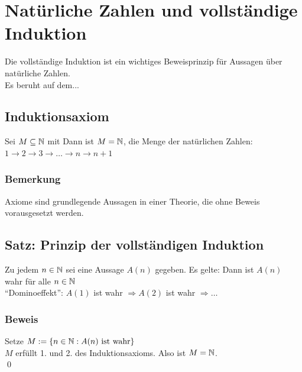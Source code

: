 \fancyhead[R]{}
\chapter{Natürliche Zahlen und vollständige Induktion}\label{P2}
Die vollständige Induktion ist ein wichtiges Beweisprinzip für Aussagen über natürliche Zahlen.\\
Es beruht auf dem...
\section{Induktionsaxiom}\label{2.1}
Sei $M \subseteq \mathbb{N}$ mit
Dann ist $M=\mathbb{N}$, die Menge der natürlichen Zahlen:\\
$1 \rightarrow 2 \rightarrow 3 \rightarrow \hdots \rightarrow n \rightarrow n+1$

\subsection*{Bemerkung}
Axiome sind grundlegende Aussagen in einer Theorie, die ohne Beweis vorausgesetzt werden.

\section{Satz: Prinzip der vollständigen Induktion}\label{2.2}
Zu jedem $n \in \mathbb{N}$ sei eine Aussage $A(n)$ gegeben. Es gelte:
Dann ist $A(n)$ wahr für alle $n \in \mathbb{N}$\\
``Dominoeffekt'': $A(1)$ ist wahr $\Rightarrow A(2)$ ist wahr $\Rightarrow \hdots$

\subsection*{Beweis}
Setze $M := \{n \in \mathbb{N} : A(n) \text{ ist wahr}\}$\\
$M$ erfüllt 1. und 2. des Induktionsaxioms. Also ist $M=\mathbb{N}$.\\
\qed

